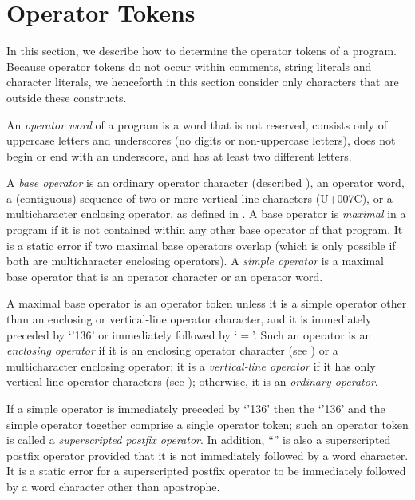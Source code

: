 

\section{Operator Tokens}

In this section,
we describe how to determine the operator tokens of a program.
Because operator tokens do not occur
within comments, string literals and character literals,
we henceforth in this section
consider only characters that are outside
these constructs.

An \emph{operator word} of a program
is a word that is not reserved,
consists only of uppercase letters and underscores
(no digits or non-uppercase letters),
does not begin or end with an underscore,
and has at least two different letters.

A \emph{base operator} is an ordinary operator character
(described ),
an operator word,
a (contiguous) sequence of two or more vertical-line characters (U+007C),
or a multicharacter enclosing operator,
as defined in .
A base operator is \emph{maximal} in a program
if it is not contained
within any other base operator of that program.
It is a static error if two maximal base operators overlap
(which is only possible if both are multicharacter enclosing operators).
A \emph{simple operator} is a maximal base operator
that is an operator character
or an operator word.

A maximal base operator is an operator token
unless it is a simple operator
other than an enclosing or vertical-line operator character,
and it is immediately preceded by `{\char'136}'
or immediately followed by `$=$'.
Such an operator is an \emph{enclosing operator}
if it is an enclosing operator character
(see )
or a multicharacter enclosing operator;
it is a \emph{vertical-line operator}
if it has only vertical-line operator characters
(see );
otherwise, it is an \emph{ordinary operator}.

If a simple operator is immediately preceded by `{\char'136}'
then the `{\char'136}' and the simple operator together
comprise a single operator token;
such an operator token is called a \emph{superscripted postfix operator}.
In addition,
``''
is also a superscripted postfix operator
provided that it is not immediately followed by a word character.
It is a static error for a superscripted postfix operator
to be immediately followed by a word character
other than apostrophe.

